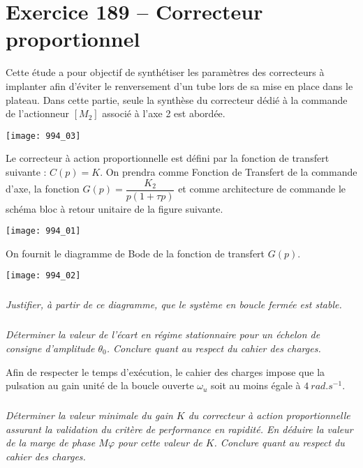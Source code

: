 \section*{Exercice 189 -- Correcteur proportionnel}
\setcounter{exo}{0}

\begin{obj}
Cette étude a pour objectif de synthétiser les paramètres des correcteurs à implanter afin d’éviter le
renversement d’un tube lors de sa mise en place dans le plateau. Dans cette partie, seule la synthèse du
correcteur dédié à la commande de l’actionneur $\left[M_2\right]$ associé à l’axe 2 est abordée.
\end{obj}

\begin{center}
\texttt{[image: 994\_03]}
\end{center}


Le correcteur à action proportionnelle est défini par la fonction de transfert suivante : $C(p) = K$.
On prendra comme Fonction de Transfert de la commande d’axe, la fonction $G(p) = \dfrac{K_2}{p\left(1+\tau p\right)}$ et comme architecture de commande le schéma bloc à retour unitaire de la figure suivante.

\begin{center}
\texttt{[image: 994\_01]}
\end{center}

On fournit le diagramme de Bode de la fonction de transfert $G(p)$.


\begin{center}
\texttt{[image: 994\_02]}
\end{center}


\subparagraph{}
\textit{Justifier, à partir de ce diagramme, que le système en boucle fermée est stable.}
\ifprof
\begin{corrige}
\end{corrige}
\else
\fi


\subparagraph{}
\textit{Déterminer la valeur de l’écart en régime stationnaire pour un échelon de consigne d’amplitude $\theta_0$.
Conclure quant au respect du cahier des charges.}
\ifprof
\begin{corrige}
\end{corrige}
\else
\fi

Afin de respecter le temps d’exécution, le cahier des charges impose que la pulsation au gain unité de la boucle
ouverte $\omega_u$ soit au moins égale à $\SI{4}{rad.s^{-1}}$.

\subparagraph{}
\textit{Déterminer la valeur minimale du gain $K$ du correcteur à action proportionnelle assurant la validation
du critère de performance en rapidité. En déduire la valeur de la marge de phase $M\varphi$ pour cette valeur de $K$.
Conclure quant au respect du cahier des charges.}
\ifprof
\begin{corrige}
\end{corrige}
\else
\fi

